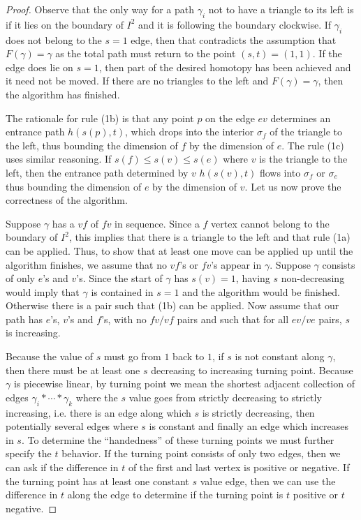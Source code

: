 \begin{proof}
	Observe that the only way for a path $\gamma_i$ not to have a triangle to its left is if it lies on the boundary of $I^2$ and it is following the boundary clockwise. If $\gamma_i$ does not belong to the $s=1$ edge, then that contradicts the assumption that $F(\gamma)=\gamma$ as the total path must return to the point $(s,t)=(1,1)$. If the edge does lie on $s=1$, then part of the desired homotopy has been achieved and it need not be moved. If there are no triangles to the left and $F(\gamma)=\gamma$, then the algorithm has finished.
	
	The rationale for rule (1b) is that any point $p$ on the edge $ev$ determines an entrance path $h(s(p),t)$, which drops into the interior $\sigma_f$ of the triangle to the left, thus bounding the dimension of $f$ by the dimension of $e$. The rule (1c) uses similar reasoning. If $s(f)\leq s(v)\leq s(e)$ where $v$ is the triangle to the left, then the entrance path determined by $v$ $h(s(v),t)$ flows into $\sigma_f$ or $\sigma_e$ thus bounding the dimension of $e$ by the dimension of $v$. Let us now prove the correctness of the algorithm.
	
	Suppose $\gamma$ has a $vf$ of $fv$ in sequence. Since a $f$ vertex cannot belong to the boundary of $I^2$, this implies that there is a triangle to the left and that rule (1a) can be applied. Thus, to show that at least one move can be applied up until the algorithm finishes, we assume that no $vf$'s or $fv$'s appear in $\gamma$. Suppose $\gamma$ consists of only $e$'s and $v$'s. Since the start of $\gamma$ has $s(v)=1$, having $s$ non-decreasing would imply that $\gamma$ is contained in $s=1$ and the algorithm would be finished. Otherwise there is a pair such that (1b) can be applied. Now assume that our path has $e$'s, $v$'s and $f$'s, with no $fv/vf$ pairs and such that for all $ev/ve$ pairs, $s$ is increasing.
	
	Because the value of $s$ must go from $1$ back to $1$, if $s$ is not constant along $\gamma$, then there must be at least one $s$ decreasing to increasing turning point. Because $\gamma$ is piecewise linear, by turning point we mean the shortest adjacent collection of edges $\gamma_i\ast\cdots\ast\gamma_{k}$ where the $s$ value goes from strictly decreasing to strictly increasing, i.e. there is an edge along which $s$ is strictly decreasing, then potentially several edges where $s$ is constant and finally an edge which increases in $s$. To determine the ``handedness'' of these turning points we must further specify the $t$ behavior. If the turning point consists of only two edges, then we can ask if the difference in $t$ of the first and last vertex is positive or negative. If the turning point has at least one constant $s$ value edge, then we can use the difference in $t$ along the edge to determine if the turning point is $t$ positive or $t$ negative.
	

\end{proof}
